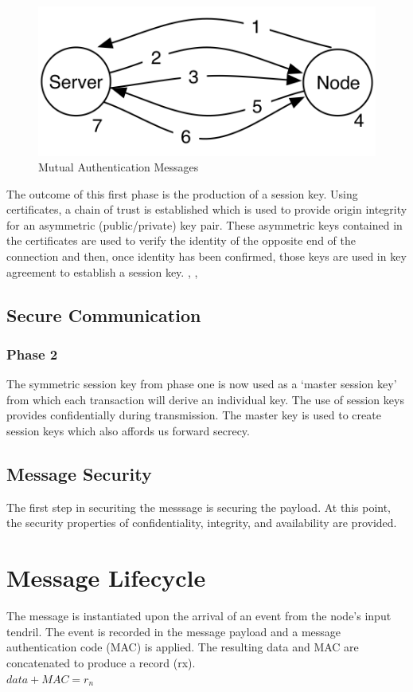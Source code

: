 \begin{figure}
    \centering
    \includegraphics[scale=1, angle=0]{Figures/mutualAuthenticationMessages}
    \caption[Mutual Authentication Messages]{Mutual Authentication Messages}
    \label{fig:mutualAuthenticationMessages}
\end{figure}

The outcome of this first phase is the production of a session key. Using certificates, a chain of trust is established which is used to provide origin integrity for an asymmetric (public/private) key pair. These asymmetric keys contained in the certificates are used to verify the identity of the opposite end of the connection and then, once identity has been confirmed, those keys are used in key agreement to establish a session key. \cite{Rescorla:2000tv}, \cite{Viega:2002wt}, \cite{Oppliger:2014wm}
\subsection{Secure Communication}
\subsubsection{Phase 2}
The symmetric session key from phase one is now used as a ‘master session key’ from which each transaction will derive an individual key. The use of session keys provides confidentially during transmission. The master key is used to create session keys which also affords us forward secrecy.  

\subsection{Message Security}
The first step in securiting the messsage is securing the payload. 
At this point, the security properties of confidentiality, integrity, and availability are provided.

\section{Message Lifecycle}
The message is instantiated upon the arrival of an event from the node’s input tendril.  The event is recorded in the message payload and a message authentication code (MAC) is applied. The resulting data and MAC are concatenated to produce a record (rx).  \\
$data + MAC = r{_n}$
 
